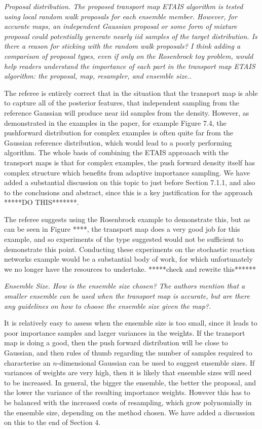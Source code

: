 \documentclass{article}
\newcommand{\comment}[2]{\vspace{0.6cm}{\bf Comment:} {\it #1.}

\vspace{0.3cm}{\bf Answer:} #2}
\begin{document}

\comment{Proposal distribution. The proposed transport map ETAIS algorithm is tested using local random walk proposals for each ensemble member. However, for accurate maps, an independent Gaussian proposal or some form of mixture proposal could potentially generate nearly iid samples of the target distribution. Is there a reason for sticking with the random walk proposals? I think adding a comparison of proposal types, even if only on the Rosenbrock toy problem, would help readers understand the importance of each part in the transport map ETAIS algorithm: the proposal, map, resampler, and ensemble size.}{The referee is entirely correct that in the situation that the transport map is able to capture all of the posterior features, that independent sampling from the reference Gaussian will produce near iid samples from the density. However, as demonstrated in the examples in the paper, for example Figure 7.4, the pushforward distribution for complex examples is often quite far from the Gaussian reference distribution, which would lead to a poorly performing algorithm. The whole basis of combining the ETAIS approaach with the transport maps is that for complex examples, the push forward density itself has complex structure which benefits from adaptive importance sampling. We have added a substantial discussion on this topic to just before Section 7.1.1, and also to the conclusions and abstract, since this is a key justification for the approach *****DO THIS*******.

  The referee suggests using the Rosenbrock example to demonstrate this, but as can be seen in Figure ****, the transport map does a very good job for this example, and so experiments of the type suggested would not be sufficient to demonstrate this point. Conducting these experiments on the stochastic reaction networks example would be a substantial body of work, for which unfortunately we no longer have the resources to undertake. *****check and rewrite this******}


\comment{Ensemble Size. How is the ensemble size chosen? The authors mention that a smaller ensemble can be used when the transport map is accurate, but are there any guidelines on how to choose the ensemble size given the map?}{It is relatively easy to assess when the ensemble size is too small, since it leads to poor importance samples and larger variances in the weights. If the transport map is doing a good, then the push forward distribution will be close to Gaussian, and then rules of thumb regarding the number of samples required to characterise an $n$-dimensional Gaussian can be used to suggest ensemble sizes. If variances of weights are very high, then it is likely that ensemble sizes will need to be increased. In general, the bigger the ensemble, the better the proposal, and the lower the variance of the resulting importance weights. However this has to be balanced with the increased costs of resampling, which grow polynomially in the ensemble size, depending on the method chosen. We have added a discussion on this to the end of Section 4.}
\end{document}
